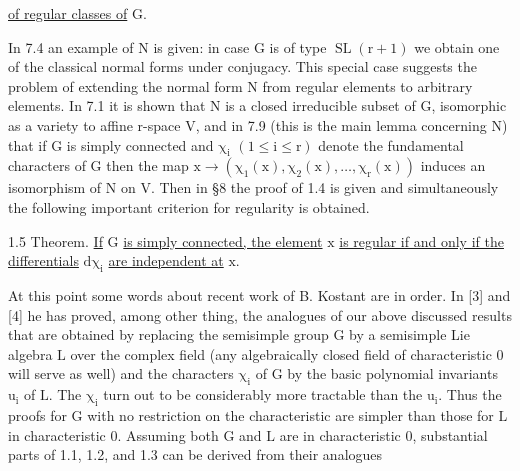 \uline{of regular classes of} $\mathrm{G}$.

In 7.4 an example of $\mathrm{N}$ is given: in case $\mathrm{G}$ is of type $\mathrm{\operatorname{SL}(r+1)}$
we obtain one of the classical normal forms under conjugacy. This special
case suggests the problem of extending the normal form $\mathrm{N}$ from regular
elements to arbitrary elements. In 7.1 it is shown that $\mathrm{N}$ is a closed
irreducible subset of $\mathrm{G}$, isomorphic as a variety to affine $\mathrm{r}$-space $\mathrm{V}$,
and in 7.9 (this is the main lemma concerning $\mathrm{N}$) that if $\mathrm{G}$ is simply
connected and $\mathrm{\chi_i}$ $\mathrm{(1\leq i\leq r)}$ denote the fundamental characters of $\mathrm{G}$
then the map $\mathrm{x\to(\chi_1(x),\chi_2(x),\ldots,\chi_r(x))}$ induces an isomorphism of $\mathrm{N}$
on $\mathrm{V}$. Then in \S8 the proof of 1.4 is given and simultaneously the following
important criterion for regularity is obtained.

1.5 Theorem. \uline{If} $\mathrm{G}$ \uline{is simply connected, the element} $\mathrm{x}$ \uline{is regular
if and only if the differentials} $\mathrm{d\chi_i}$ \uline{are independent at} $\mathrm{x}$.

At this point some words about recent work of B. Kostant are in order.
In [3] and [4] he has proved, among other thing, the analogues of our above
discussed results that are obtained by replacing the semisimple group $\mathrm{G}$ by
a semisimple Lie algebra $\mathrm{L}$ over the complex field (any algebraically
closed field of characteristic $\mathrm{0}$ will serve as well) and the characters
$\mathrm{\chi_i}$ of $\mathrm{G}$ by the basic polynomial invariants $\mathrm{u_i}$ of $\mathrm{L}$. The $\mathrm{\chi_i}$ turn
out to be considerably more tractable than the $\mathrm{u_i}$. Thus the proofs for $\mathrm{G}$
with no restriction on the characteristic are simpler than those for $\mathrm{L}$ in
characteristic $\mathrm{0}$. Assuming both $\mathrm{G}$ and $\mathrm{L}$ are in characteristic $\mathrm{0}$,
substantial parts of 1.1, 1.2, and 1.3 can be derived from their analogues

